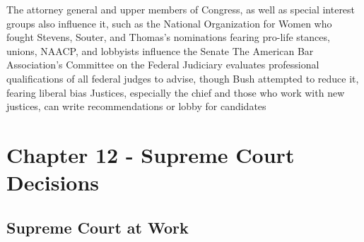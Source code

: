 \documentclass[11 pt, twoside]{article}
\newenvironment{outline*}
{
	\begin{outline}[enumerate]
	}
	{\end{outline}
}
\begin{document}
\begin{outline*}
\2 The attorney general and upper members of Congress, as well as special interest groups also influence it, such as the National Organization for Women who fought Stevens, Souter, and Thomas’s nominations fearing pro-life stances, unions, NAACP, and lobbyists influence the Senate
\2 The American Bar Association’s Committee on the Federal Judiciary evaluates professional qualifications of all federal judges to advise, though Bush attempted to reduce it, fearing liberal bias
\2 Justices, especially the chief and those who work with new justices, can write recommendations or lobby for candidates
\end{outline*}
\section{Chapter 12 - Supreme Court Decisions}
\subsection{Supreme Court at Work}
\end{document}
